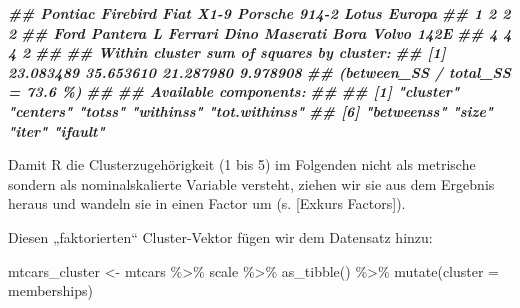 \documentclass[
  ngerman,
]{article}
\newenvironment{Shaded}{\begin{snugshade}}{\end{snugshade}}
\newcommand{\AttributeTok}[1]{\textcolor[rgb]{0.77,0.63,0.00}{#1}}
\newcommand{\DecValTok}[1]{\textcolor[rgb]{0.00,0.00,0.81}{#1}}
\newcommand{\DocumentationTok}[1]{\textcolor[rgb]{0.56,0.35,0.01}{\textbf{\textit{#1}}}}
\newcommand{\FunctionTok}[1]{\textcolor[rgb]{0.00,0.00,0.00}{#1}}
\newcommand{\NormalTok}[1]{#1}
\newcommand{\OtherTok}[1]{\textcolor[rgb]{0.56,0.35,0.01}{#1}}
\newcommand{\SpecialCharTok}[1]{\textcolor[rgb]{0.00,0.00,0.00}{#1}}
\begin{document}
\begin{Shaded}
\begin{Highlighting}[]
\DocumentationTok{\#\#    Pontiac Firebird           Fiat X1{-}9       Porsche 914{-}2        Lotus Europa }
\DocumentationTok{\#\#                   1                   2                   2                   2 }
\DocumentationTok{\#\#      Ford Pantera L        Ferrari Dino       Maserati Bora          Volvo 142E }
\DocumentationTok{\#\#                   4                   4                   4                   2 }
\DocumentationTok{\#\# }
\DocumentationTok{\#\# Within cluster sum of squares by cluster:}
\DocumentationTok{\#\# [1] 23.083489 35.653610 21.287980  9.978908}
\DocumentationTok{\#\#  (between\_SS / total\_SS =  73.6 \%)}
\DocumentationTok{\#\# }
\DocumentationTok{\#\# Available components:}
\DocumentationTok{\#\# }
\DocumentationTok{\#\# [1] "cluster"      "centers"      "totss"        "withinss"     "tot.withinss"}
\DocumentationTok{\#\# [6] "betweenss"    "size"         "iter"         "ifault"}
\end{Highlighting}
\end{Shaded}

Damit R die Clusterzugehörigkeit (1 bis 5) im Folgenden nicht als metrische sondern als nominalskalierte Variable versteht, ziehen wir sie aus dem Ergebnis heraus und wandeln sie in einen Factor um (s. {[}Exkurs Factors{]}).

\begin{Shaded}
\end{Shaded}

Diesen „faktorierten`` Cluster-Vektor fügen wir dem Datensatz hinzu:

\begin{Shaded}
\begin{Highlighting}[]
\NormalTok{mtcars\_cluster }\OtherTok{\textless{}{-}}\NormalTok{ mtcars }\SpecialCharTok{\%\textgreater{}\%}
\NormalTok{  scale }\SpecialCharTok{\%\textgreater{}\%}
  \FunctionTok{as\_tibble}\NormalTok{() }\SpecialCharTok{\%\textgreater{}\%}
  \FunctionTok{mutate}\NormalTok{(}\AttributeTok{cluster =}\NormalTok{ memberships)}
\end{Highlighting}
\end{Shaded}
\end{document}
